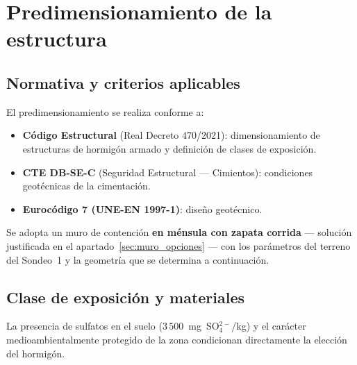 \section{Predimensionamiento de la estructura}
\label{sec:muro_predim}

\subsection{Normativa y criterios aplicables}

El predimensionamiento se realiza conforme a:

\begin{itemize}
  \item \textbf{Código Estructural} (Real Decreto 470/2021): dimensionamiento
        de estructuras de hormigón armado y definición de clases de exposición.
  \item \textbf{CTE DB-SE-C} (Seguridad Estructural — Cimientos): condiciones
        geotécnicas de la cimentación.
  \item \textbf{Eurocódigo 7 (UNE-EN 1997-1)}: diseño geotécnico.
\end{itemize}

Se adopta un muro de contención \textbf{en ménsula con zapata corrida} —
solución justificada en el apartado~\ref{sec:muro_opciones} — con los
parámetros del terreno del Sondeo~1 y la geometría que se determina a
continuación.

\subsection{Clase de exposición y materiales}

La presencia de sulfatos en el suelo ($3\,500$~mg~SO$_4^{2-}$/kg) y el
carácter medioambientalmente protegido de la zona condicionan directamente
la elección del hormigón.

